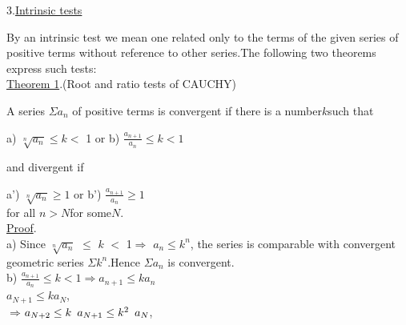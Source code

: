 \documentclass[11pt]{amsbook}
\begin{document}

 
    
    3.\underline{Intrinsic tests }
    
    \par  
        By an intrinsic test we mean one related only to the terms 
        of the given series of positive terms without reference to other 
        series.The following two theorems express such tests:\\
    

    \underline{Theorem 1}.\quad(Root and ratio tests of CAUCHY)

   
    \par
        A series \quad $\Sigma {a_n}$ \quad of positive terms is convergent if there is 
        a number\quad $k$\quad such that\\
    \par
 
    a) $\sqrt[n]{a_n} \leq k <$ 1 \hspace{30 pt} or \hspace{30 pt}  b) $\frac{{a_{n+1}}}{{a_n}}  \leq k < 1$ \\
   
    \par\noindent
    and divergent if\\
    \par

    a') $\sqrt[n]{a_n} \geq 1$\hspace{47 pt} or \hspace{30 pt} b') $\frac{{a_{n+1}}}{{a_n}} \geq 1$\\
    for all \quad $n>N$\quad for some\quad $N$.\\

    \underline{Proof}.\\

    a) Since $\sqrt[n]{a_n}$ $\leq$ $k$ $<$  1\quad $\Longrightarrow$ \quad${a_n} \leq k^n$, the series is comparable with convergent geometric series $ \Sigma k^n$.Hence $\Sigma a_n$ is convergent.\\

    b) $\frac{{a_{n+1}}}{{a_n}}  \leq k < 1$\quad $\Longrightarrow$\quad${a_{n+1}} \leq k  {a_n}$\\

    \hspace{50 pt}${a_{N+1}} \leq  k  {a_N} $,\\

    $\Rightarrow$\qquad\qquad${a_{N+2}} \leq  k \hspace{5 pt}{a_{N+1}} \leq  k^2 \hspace{5 pt} {a_N}$,\\
\end{document}
